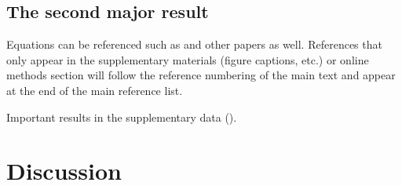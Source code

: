 
\subsection*{The second major result}

Equations can be referenced such as  and other papers as well\cite{Hill78a}. References
that only appear in the supplementary materials (figure captions, etc.) or online methods section
will follow the reference numbering of the main text and appear at the end of the main reference
list. \lipsum[5]

Important results in the supplementary data (). \lipsum[6]

\section*{Discussion}

\lipsum[7-9]

